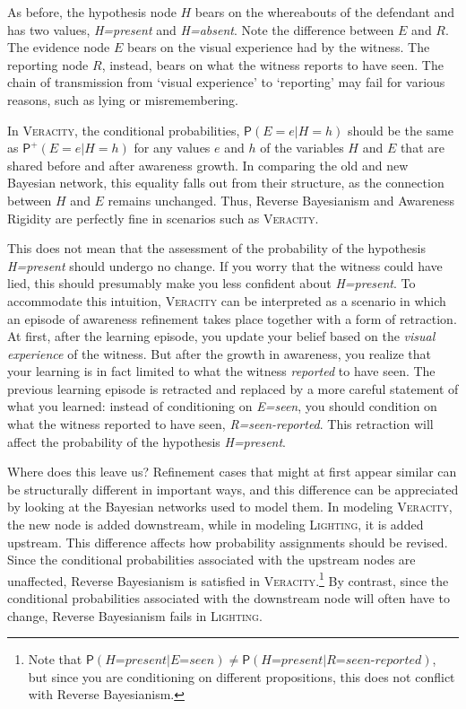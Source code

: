 \documentclass[
  11pt,
  dvipsnames,enabledeprecatedfontcommands]{scrartcl}
\newcommand{\pr}[1]{\ensuremath{\mathsf{P}(#1)}}
\newcommand{\ppr}[2]{\ensuremath{\mathsf{P}^{#1}(#2)}}
\begin{document}
\noindent As before, the hypothesis node \(H\) bears on the whereabouts
of the defendant and has two values, \textit{H=present} and
\textit{H=absent}. Note the difference between \(E\) and \(R\). The
evidence node \(E\) bears on the visual experience had by the witness.
The reporting node \(R\), instead, bears on what the witness reports to
have seen. The chain of transmission from `visual experience' to
`reporting' may fail for various reasons, such as lying or
misremembering.

In \textsc{Veracity}, the conditional probabilities,
\(\pr{E=e \vert H=h}\) should be the same as \(\ppr{+}{E=e \vert H=h}\)
for any values \(e\) and \(h\) of the variables \(H\) and \(E\) that are
shared before and after awareness growth. In comparing the old and new
Bayesian network, this equality falls out from their structure, as the
connection between \(H\) and \(E\) remains unchanged. Thus, Reverse
Bayesianism and Awareness Rigidity are perfectly fine in scenarios such
as \textsc{Veracity}.

This does not mean that the assessment of the probability of the
hypothesis \textit{H=present} should undergo no change. If you worry
that the witness could have lied, this should presumably make you less
confident about \textit{H=present}. To accommodate this intuition,
\textsc{Veracity} can be interpreted as a scenario in which an episode
of awareness refinement takes place together with a form of retraction.
At first, after the learning episode, you update your belief based on
the \textit{visual experience} of the witness. But after the growth in
awareness, you realize that your learning is in fact limited to what the
witness \textit{reported} to have seen. The previous learning episode is
retracted and replaced by a more careful statement of what you learned:
instead of conditioning on \textit{E=seen}, you should condition on what
the witness reported to have seen, \textit{R=seen-reported}. This
retraction will affect the probability of the hypothesis
\textit{H=present}.

Where does this leave us? Refinement cases that might at first appear
similar can be structurally different in important ways, and this
difference can be appreciated by looking at the Bayesian networks used
to model them. In modeling \textsc{Veracity}, the new node is added
downstream, while in modeling \textsc{Lighting}, it is added upstream.
This difference affects how probability assignments should be revised.
Since the conditional probabilities associated with the upstream nodes
are unaffected, Reverse Bayesianism is satisfied in
\textsc{Veracity}.\footnote{Note that
  \(\pr{\textit{H=present}\vert \textit{E=seen}}\neq \pr{\textit{H=present}\vert \textit{R=seen-reported}}\),
  but since you are conditioning on different propositions, this does
  not conflict with Reverse Bayesianism.} By contrast, since the
conditional probabilities associated with the downstream node will often
have to change, Reverse Bayesianism fails in \textsc{Lighting}.
\end{document}
